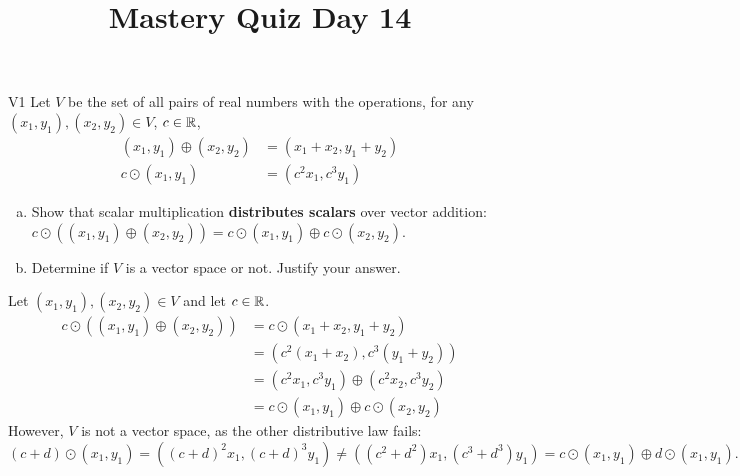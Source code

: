\documentclass{sbgLAquiz}
\title{Mastery Quiz Day 14 }
\begin{document}
\begin{problem}{V1}
Let $V$ be the set of all pairs of real numbers with the operations, for any $(x_1,y_1), (x_2,y_2) \in V$, $c \in \mathbb{R}$,
\begin{align*}
(x_1,y_1) \oplus (x_2,y_2) &= (x_1+x_2,y_1+y_2) \\
c \odot (x_1,y_1) &= (c^2x_1, c^3y_1)
\end{align*}
\begin{enumerate}[(a)]
\item Show that scalar multiplication \textbf{distributes scalars} over
      vector addition:
      \(c\odot((x_1,y_1) \oplus (x_2,y_2))=
      c\odot(x_1,y_1) \oplus c\odot(x_2,y_2)\).
\item Determine if $V$ is a vector space or not.  Justify your answer.
\end{enumerate}
\end{problem}
\begin{solution}
Let $(x_1,y_1), (x_2,y_2) \in V$ and let $c \in \mathbb{R}$.
\begin{align*}
c \odot \left( (x_1,y_1) \oplus (x_2,y_2) \right) &= c \odot (x_1+x_2,y_1+y_2) \\
&= (c^2(x_1+x_2), c^3(y_1+y_2) ) \\
&= (c^2x_1,c^3y_1) \oplus (c^2x_2,c^3y_2) \\
&= c \odot (x_1,y_1) \oplus c \odot (x_2,y_2)
\end{align*}
However, $V$ is not a vector space, as the other distributive law fails:
$$(c+d) \odot (x_1,y_1) = ( (c+d)^2 x_1, (c+d)^3 y_1) \neq ((c^2+d^2)x_1, (c^3+d^3)y_1) = c \odot (x_1,y_1) \oplus d \odot (x_1,y_1).$$
\end{solution}
\end{document}
